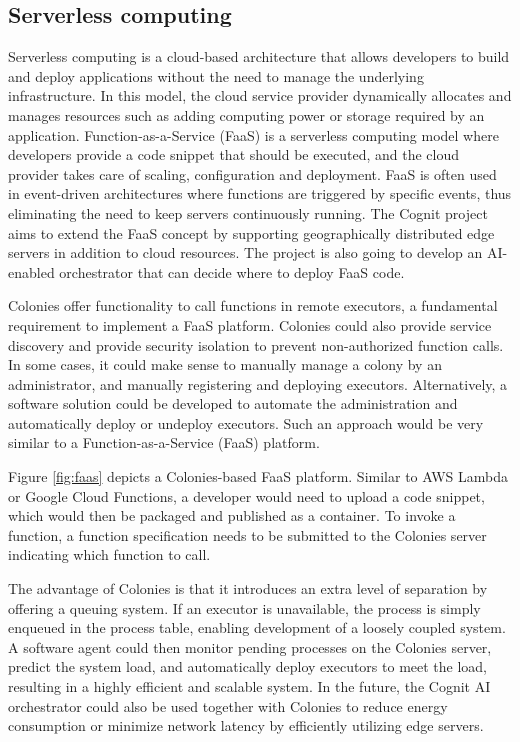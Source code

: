 \documentclass{article}
\begin{document}
\subsection{Serverless computing}
\label{faas}
Serverless computing is a cloud-based architecture that allows developers to build and deploy applications without the need to manage the underlying infrastructure. In this model, the cloud service provider dynamically allocates and manages resources such as adding computing power or storage required by an application. Function-as-a-Service (FaaS) is a serverless computing model where developers provide a code snippet that should be executed, and the cloud provider takes care of scaling, configuration and deployment. FaaS is often used in event-driven architectures where functions are triggered by specific events, thus eliminating the need to keep servers continuously running. The Cognit project \cite{cognit} aims to extend the FaaS concept by supporting geographically distributed edge servers in addition to cloud resources. The project is also going to develop an AI-enabled orchestrator that can decide where to deploy FaaS code.

Colonies offer functionality to call functions in remote executors, a fundamental requirement to implement a FaaS platform. Colonies could also provide service discovery and provide security isolation to prevent non-authorized function calls. In some cases, it could make sense to manually manage a colony by an administrator, and manually registering and deploying executors. Alternatively, a software solution could be developed to automate the administration and automatically deploy or undeploy executors. Such an approach would be very similar to a Function-as-a-Service (FaaS) platform.

Figure \ref{fig:faas} depicts a Colonies-based FaaS platform. Similar to AWS Lambda or Google Cloud Functions, a developer would need to upload a code snippet, which would then be packaged and published as a container. To invoke a function, a function specification needs to be submitted  to the Colonies server indicating which function to call. 

The advantage of Colonies is that it introduces an extra level of separation by offering a queuing system. If an executor is unavailable, the process is simply enqueued in the process table, enabling development of a loosely coupled system. A software agent could then monitor pending processes on the Colonies server, predict the system load, and automatically deploy executors to meet the load, resulting in a highly efficient and scalable system. In the future, the Cognit AI orchestrator could also be used together with Colonies to reduce energy consumption or minimize network latency by efficiently utilizing edge servers.
\end{document}

